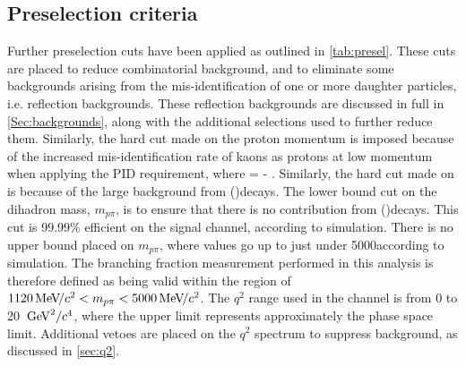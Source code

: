 \subsection{Preselection criteria}\label{Sec:Presel}


Further preselection cuts have been applied as outlined in \autoref{tab:presel}.  These cuts are placed to reduce combinatorial background, and to eliminate some backgrounds arising from the mis-identification of one or more daughter particles, i.e. reflection backgrounds. These reflection backgrounds are discussed in full in \autoref{Sec:backgrounds}, along with the additional selections used to further reduce them. Similarly, the hard cut made on the proton momentum is imposed because of the increased mis-identification rate of kaons as protons at low momentum when applying the PID \dllpk requirement, where \dllpk = \dllppi - \dllkpi. Similarly, the hard cut made on \dllpk is because of the large background from \Bd\to\Kstarz(\to\Kp\pim)\mumu decays. The lower bound cut on the dihadron mass, $m_{p\pi}$, is to ensure that there is no contribution from \Lb\to\Lz(\to\proton\pim)\mumu decays. This cut is 99.99\% efficient on the signal channel, according to simulation. There is no upper bound placed on $m_{p\pi}$, where values go up to just under 5000\mevcc according to simulation. The branching fraction measurement performed in this analysis is therefore defined as being valid within the region of $1120{\mathrm{\,Me\kern -0.1em V\!/}c^2}<m_{p\pi}<5000{\mathrm{\,Me\kern -0.1em V\!/}c^2}$. The $q^{2}$ range used in the \Lbpi channel is from 0 to 20 $\mathrm{\,Ge\kern -0.1em V}^{2}/c^{4}$, where the upper limit represents approximately the phase space limit. Additional vetoes are placed on the $q^{2}$ spectrum to suppress background, as discussed in \autoref{sec:q2}.





